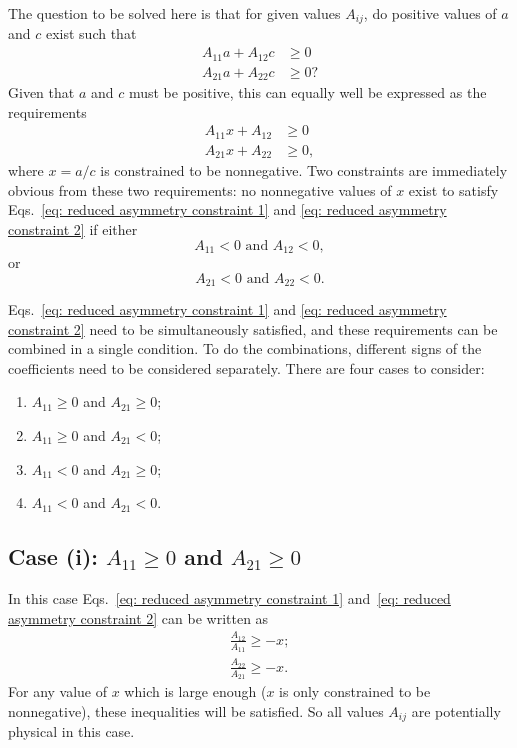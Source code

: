 The question to be solved here is that for given values $A_{ij}$, do positive values of $a$ and $c$ exist such that
\begin{align}
    A_{11}a + A_{12}c &\geq 0\\
    A_{21}a + A_{22}c &\geq 0?
\end{align}
Given that $a$ and $c$ must be positive, this can equally well be expressed as the requirements
\begin{align}
    A_{11}x + A_{12} &\geq 0\label{eq: reduced asymmetry constraint 1}\\
    A_{21}x + A_{22} &\geq 0,\label{eq: reduced asymmetry constraint 2}
\end{align}
where $x = a/c$ is constrained to be nonnegative. Two constraints are immediately obvious from these two requirements: no nonnegative values of $x$ exist to satisfy Eqs.~\eqref{eq: reduced asymmetry constraint 1} and \eqref{eq: reduced asymmetry constraint 2} if either
\begin{equation}
    \label{eq: constraint 1}
    A_{11} < 0\text{ and }A_{12} < 0,
\end{equation}
    or
\begin{equation}
    \label{eq: constraint 2}
    A_{21} < 0\text{ and }A_{22} < 0.
\end{equation}
    
Eqs.~\eqref{eq: reduced asymmetry constraint 1} and \eqref{eq: reduced asymmetry constraint 2} need to be simultaneously satisfied, and these requirements can be combined in a single condition. To do the combinations, different signs of the coefficients need to be considered separately. There are four cases to consider:
\begin{enumerate}
    \item $A_{11} \geq 0$ and $A_{21} \geq 0$;
    \item $A_{11} \geq 0$ and $A_{21} < 0$;
    \item $A_{11} < 0$ and $A_{21} \geq 0$;
    \item $A_{11} < 0$ and $A_{21} < 0$.
\end{enumerate}

\subsection*{Case (i): $A_{11} \geq 0$ and $A_{21} \geq 0$}
In this case Eqs.~\eqref{eq: reduced asymmetry constraint 1} and~\eqref{eq: reduced asymmetry constraint 2} can be written as
\begin{align}
    \frac{A_{12}}{A_{11}} \geq -x; \label{eq: case 1-1}\\
    \frac{A_{22}}{A_{21}} \geq -x.\label{eq: case 1-2}
\end{align}
For any value of $x$ which is large enough ($x$ is only constrained to be nonnegative), these inequalities will be satisfied. So all values $A_{ij}$ are potentially physical in this case.

